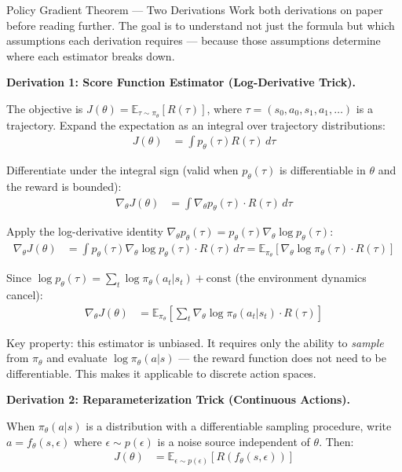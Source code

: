 \begin{thinkfirst}{Policy Gradient Theorem --- Two Derivations}
Work both derivations on paper before reading further. The goal is to understand not just the formula but which assumptions each derivation requires --- because those assumptions determine where each estimator breaks down.

\textbf{Derivation 1: Score Function Estimator (Log-Derivative Trick).}

The objective is $J(\theta) = \mathbb{E}_{\tau \sim \pi_\theta}[R(\tau)]$, where $\tau = (s_0, a_0, s_1, a_1, \ldots)$ is a trajectory. Expand the expectation as an integral over trajectory distributions:
\begin{align*}
  J(\theta) &= \int p_\theta(\tau) R(\tau) \, d\tau
\end{align*}

Differentiate under the integral sign (valid when $p_\theta(\tau)$ is differentiable in $\theta$ and the reward is bounded):
\begin{align*}
  \nabla_\theta J(\theta) &= \int \nabla_\theta p_\theta(\tau) \cdot R(\tau) \, d\tau
\end{align*}

Apply the log-derivative identity $\nabla_\theta p_\theta(\tau) = p_\theta(\tau) \nabla_\theta \log p_\theta(\tau)$:
\begin{align*}
  \nabla_\theta J(\theta) &= \int p_\theta(\tau) \nabla_\theta \log p_\theta(\tau) \cdot R(\tau) \, d\tau = \mathbb{E}_{\pi_\theta}\!\left[\nabla_\theta \log \pi_\theta(\tau) \cdot R(\tau)\right]
\end{align*}

Since $\log p_\theta(\tau) = \sum_t \log \pi_\theta(a_t | s_t) + \text{const}$ (the environment dynamics cancel):
\begin{align*}
  \nabla_\theta J(\theta) &= \mathbb{E}_{\pi_\theta}\!\left[\sum_t \nabla_\theta \log \pi_\theta(a_t|s_t) \cdot R(\tau)\right]
\end{align*}

Key property: this estimator is unbiased. It requires only the ability to \textit{sample} from $\pi_\theta$ and evaluate $\log \pi_\theta(a|s)$ --- the reward function does not need to be differentiable. This makes it applicable to discrete action spaces.

\textbf{Derivation 2: Reparameterization Trick (Continuous Actions).}

When $\pi_\theta(a|s)$ is a distribution with a differentiable sampling procedure, write $a = f_\theta(s, \epsilon)$ where $\epsilon \sim p(\epsilon)$ is a noise source independent of $\theta$. Then:
\begin{align*}
  J(\theta) &= \mathbb{E}_{\epsilon \sim p(\epsilon)}\!\left[R(f_\theta(s, \epsilon))\right]
\end{align*}


\end{thinkfirst}
